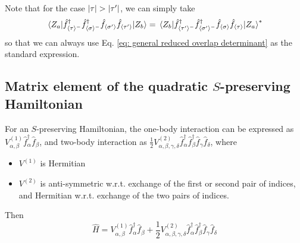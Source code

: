 \documentclass[12pt]{article}
\newcommand{\seq}[1]{\langle #1\rangle}
\newcommand{\hc}{^\dagger}
\begin{document}
	Note that for the case $\abs{\tau}>\abs{\tau'}$, we can simply take
	\begin{equation}
	\mel{Z_a}{\hat{f}\hc_{\seq{\tau}^-}\hat{f}\hc_{\seq{\sigma}^-}\hat{f}_{\seq{\sigma'}}\hat{f}_{\seq{\tau'}}}{Z_b}=\mel{Z_b}{\hat{f}\hc_{\seq{\tau'}^-}\hat{f}\hc_{\seq{\sigma'}^-}\hat{f}_{\seq{\sigma}}\hat{f}_{\seq{\tau}}}{Z_a}^*
	\end{equation}
	so that we can always use Eq. \ref{eq: general reduced overlap determinant} as the standard expression.
	 
	
	\subsection{Matrix element of the quadratic $S$-preserving Hamiltonian}
	For an $S$-preserving Hamiltonian, the one-body interaction can be expressed as $V^{(1)}_{\alpha,\beta}\hat{f}\hc_\alpha\hat{f}_\beta$, and two-body interaction as $\frac{1}{2}V^{(2)}_{\alpha,\beta,\gamma,\delta}\hat{f}\hc_\alpha\hat{f}\hc_\beta\hat{f}_\gamma\hat{f}_\delta$, where
	\begin{itemize}
	\item $V^{(1)}$ is Hermitian
	\item $V^{(2)}$ is anti-symmetric w.r.t. exchange of the first or second pair of indices, and Hermitian w.r.t. exchange of the two pairs of indices.
	\end{itemize}
	Then
	\begin{equation}
	\hat{H}=V^{(1)}_{\alpha,\beta}\hat{f}\hc_\alpha\hat{f}_\beta+\frac{1}{2}V^{(2)}_{\alpha,\beta,\gamma,\delta}\hat{f}\hc_\alpha\hat{f}\hc_\beta\hat{f}_\gamma\hat{f}_\delta
	\end{equation}
	
	\appendix
	
\end{document}
